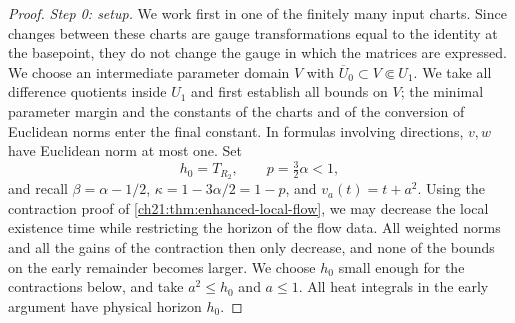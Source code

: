 \begin{proof}
\emph{Step 0: setup.} We work first in one of the finitely many input charts. Since changes between these charts are gauge transformations equal to the identity at the basepoint, they do not change the gauge in which the matrices are expressed. We choose an intermediate parameter domain $V$ with $\overline U_0\subset V\Subset U_1$. We take all difference quotients inside $U_1$ and first establish all bounds on $V$; the minimal parameter margin and the constants of the charts and of the conversion of Euclidean norms enter the final constant. In formulas involving directions, $v,w$ have Euclidean norm at most one. Set
\[
 h_0=T_{R_2},\qquad p=\tfrac32\alpha<1 ,
\]
and recall $\beta=\alpha-1/2$, $\kappa=1-3\alpha/2=1-p$, and $v_a(t)=t+a^2$. Using the contraction proof of \cref{ch21:thm:enhanced-local-flow}, we may decrease the local existence time while restricting the horizon of the flow data. All weighted norms and all the gains of the contraction then only decrease, and none of the bounds on the early remainder becomes larger. We choose $h_0$ small enough for the contractions below, and take $a^2\le h_0$ and $a\le1$. All heat integrals in the early argument have physical horizon $h_0$.


\end{proof}
